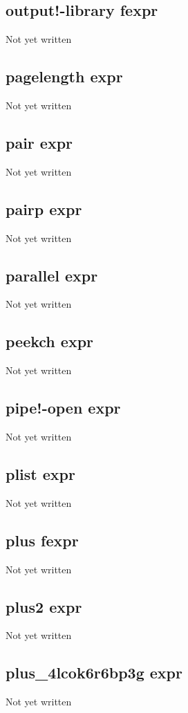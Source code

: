 \documentclass[a4paper,11pt]{article}
\begin{document}
\subsection{\ttfamily output!-library fexpr}
Not yet written

\subsection{\ttfamily pagelength expr}
Not yet written

\subsection{\ttfamily pair expr}
Not yet written

\subsection{\ttfamily pairp expr}
Not yet written

\subsection{\ttfamily parallel expr}
Not yet written

\subsection{\ttfamily peekch expr}
Not yet written

\subsection{\ttfamily pipe!-open expr}
Not yet written

\subsection{\ttfamily plist expr}
Not yet written

\subsection{\ttfamily plus fexpr}
Not yet written

\subsection{\ttfamily plus2 expr}
Not yet written

\subsection{\ttfamily plus\_4lcok6r6bp3g expr}
Not yet written
\end{document}
